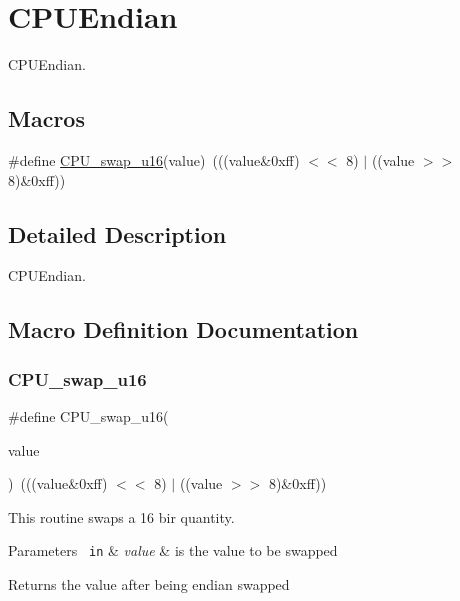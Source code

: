\hypertarget{group__RTEMSScoreCPUExampleCPUEndian}{}\section{C\+P\+U\+Endian}
\label{group__RTEMSScoreCPUExampleCPUEndian}


C\+P\+U\+Endian.  


\subsection*{Macros}
\begin{DoxyCompactItemize}
\item 
\#define \mbox{\hyperlink{group__RTEMSScoreCPUExampleCPUEndian_ga1936ecb0107e5875a7b538374c1f621d}{C\+P\+U\+\_\+swap\+\_\+u16}}(value)~(((value\&0xff) $<$$<$ 8) $\vert$ ((value $>$$>$ 8)\&0xff))
\end{DoxyCompactItemize}


\subsection{Detailed Description}
C\+P\+U\+Endian. 



\subsection{Macro Definition Documentation}
\mbox{\label{group__RTEMSScoreCPUExampleCPUEndian_ga1936ecb0107e5875a7b538374c1f621d}} 
\subsubsection{\texorpdfstring{CPU\_swap\_u16}{CPU\_swap\_u16}}
{\footnotesize\ttfamily \#define C\+P\+U\+\_\+swap\+\_\+u16(\begin{DoxyParamCaption}\item[{}]{value }\end{DoxyParamCaption})~(((value\&0xff) $<$$<$ 8) $\vert$ ((value $>$$>$ 8)\&0xff))}

This routine swaps a 16 bir quantity.


\begin{DoxyParams}[1]{Parameters}
\mbox{\texttt{ in}}  & {\em value} & is the value to be swapped \\
\hline
\end{DoxyParams}
\begin{DoxyReturn}{Returns}
the value after being endian swapped 
\end{DoxyReturn}
